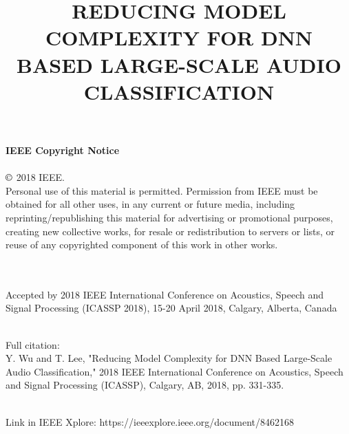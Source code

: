\documentclass{article}
\title{REDUCING MODEL COMPLEXITY FOR DNN BASED LARGE-SCALE AUDIO CLASSIFICATION}
\begin{document}
%


\newpage
\onecolumn

{\noindent \LARGE \textbf{IEEE Copyright Notice}} \\
~\\
{\noindent \Large $\copyright$ 2018 IEEE. \\
Personal use of this material is permitted. Permission from IEEE must be obtained for all other uses, in any current or future media, including reprinting/republishing this material for advertising or promotional purposes, creating new collective works, for resale or redistribution to servers or lists, or reuse of any copyrighted component of this work in other works. }

~\\
~\\

{\noindent \Large Accepted by 2018 IEEE International Conference on Acoustics, Speech and Signal Processing (ICASSP 2018), 15-20 April 2018, Calgary, Alberta, Canada}

~\\

{\noindent \Large Full citation: \\
Y. Wu and T. Lee, "Reducing Model Complexity for DNN Based Large-Scale Audio Classification," 2018 IEEE International Conference on Acoustics, Speech and Signal Processing (ICASSP), Calgary, AB, 2018, pp. 331-335. \\}

~\\

{\noindent \Large Link in IEEE Xplore: https://ieeexplore.ieee.org/document/8462168}


\end{document}
